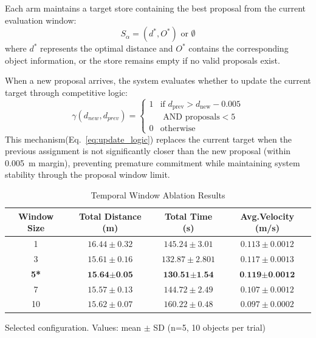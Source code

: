 \documentclass[pdflatex,sn-mathphys-num]{sn-jnl}%
\theoremstyle{thmstyleone}%
\theoremstyle{thmstylethree}%
\begin{document}
\noindent Each arm maintains a target store containing the best proposal from the current evaluation window:
\begin{equation}
S_\alpha = (d^{*}, O^{*}) \text{ or } \emptyset
\label{eq:target_store}
\end{equation}
where $d^{*}$ represents the optimal distance and $O^{*}$ contains the corresponding object information, or the store remains empty if no valid proposals exist.

\noindent When a new proposal arrives, the system evaluates whether to update the current target through competitive logic:
\begin{equation}
\gamma(d_{new}, d_{prev}) =
\begin{cases}
1 & \text{if } d_{\text{prev}} > d_{\text{new}} - 0.005\\ 
&\text{ AND proposals} < 5 \\
0 & \text{otherwise}
\end{cases}
\label{eq:update_logic}
\end{equation}
This mechanism(Eq.~\ref{eq:update_logic}) replaces the current target when the previous assignment is not significantly closer than the new proposal (within 0.005~m margin), preventing premature commitment while maintaining system stability through the proposal window limit.
\begin{table}[t]
    \centering
    \caption{Temporal Window Ablation Results}
    \label{temporal_window}
    \scriptsize
        \begin{tabular}{c c c c}
        \toprule
        \textbf{Window Size} & \textbf{Total Distance (m)} & \textbf{Total Time (s)} & \textbf{Avg.Velocity (m/s)}  \\
        \midrule\midrule
        1   & $16.44 \pm 0.32$ & $145.24 \pm 3.01$ & $0.113 \pm 0.0012$\\
        3   & $15.61 \pm 0.16$  & $132.87 \pm 2.801$ & $0.117 \pm 0.0013$\\
        \textbf{5*} & $\textbf{15.64} \pm \textbf{0.05}$ & $\textbf{130.51} \pm \textbf{1.54}$ & $\textbf{0.119} \pm \textbf{0.0012}$\\
        7   & $15.57 \pm 0.13$ & $144.72 \pm 2.49$& $0.107 \pm 0.0012$\\
        10  & $15.62 \pm 0.07$ & $160.22 \pm 0.48$&$0.097 \pm 0.0002$\\
        \bottomrule
        \end{tabular}%
    \vspace{2mm} %
    \begin{flushleft}
    \footnotesize *Selected configuration. Values: mean $\pm$ SD (n=5, 10 objects per trial)
    \end{flushleft}
\end{table}
\end{document}
